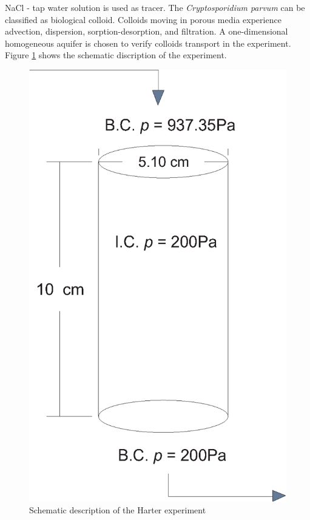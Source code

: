 NaCl - tap water solution is used as tracer. The \emph{Cryptosporidium parvum} can be classified as biological colloid. Colloids moving in porous media experience advection, dispersion, sorption-desorption, and filtration. A one-dimensional homogeneous aquifer is chosen to verify colloids transport in the experiment. Figure \ref{ExperimentSchematic} shows the schematic discription of the experiment.

\begin{figure}[h]
\centering
\includegraphics[scale=0.35]{RWPT/figures/ExperimentSchematic.eps}
\caption{Schematic description of the Harter experiment}
\label{ExperimentSchematic}
\end{figure}

